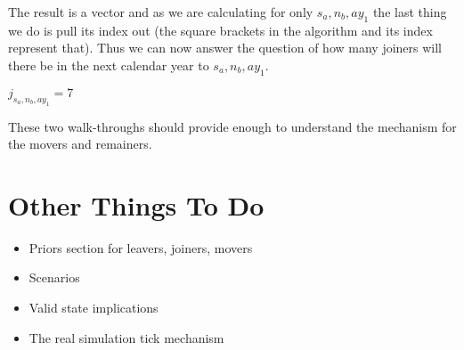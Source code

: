 \documentclass[margin=5mm]{article}
\begin{document}
The result is a vector and as we are calculating for only ${s_a,n_b,ay_1}$
the last thing we do is pull its index out (the square brackets in
the algorithm and its index represent that).  Thus we can now answer
the question of how many joiners will there be in the next calendar
year to ${s_a,n_b,ay_1}$.

$j_{s_a,n_b,ay_1} = 7$

These two walk-throughs should provide enough to understand the
mechanism for the movers and remainers.

\section{Other Things To Do}

\begin{itemize}
\item Priors section for leavers, joiners, movers
\item Scenarios
\item Valid state implications
\item The real simulation tick mechanism
\end{itemize}
\end{document}
